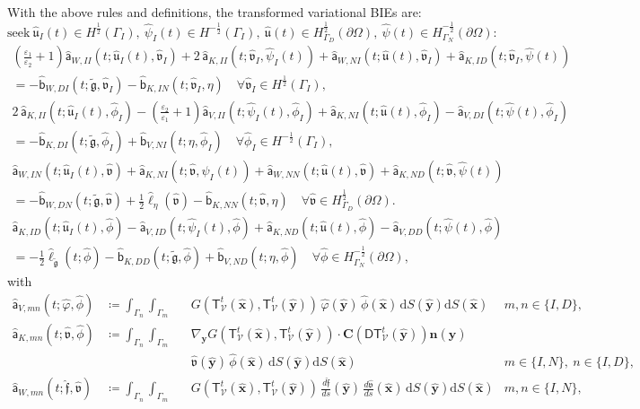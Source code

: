 \documentclass{article}
\theoremstyle{remark}
\newcommand{\T}{\mathsf{T}}
\newcommand{\aaa}{\mathsf{a}}
\newcommand{\bbb}{\mathsf{b}}
\newcommand{\hata}{\widehat{\aaa}}
\newcommand{\hatb}{\widehat{\bbb}}
\newcommand{\hatell}{\widehat{\ell}}
\newcommand{\dd}{\mathrm{d}}
\newcommand{\n}{\boldsymbol{n}}
\newcommand{\hatx}{\widehat{\boldsymbol{x}}}
\newcommand{\haty}{\widehat{\boldsymbol{y}}}
\newcommand{\argu}{\mathfrak{u}}
\newcommand{\argv}{\mathfrak{v}}
\newcommand{\argf}{\mathfrak{f}}
\newcommand{\argg}{\mathfrak{g}}
\newcommand{\tildeg}{\widetilde{\argg}}
\newcommand{\hatu}{\widehat{\argu}}
\newcommand{\hatv}{\widehat{\argv}}
\newcommand{\hatf}{\widehat{\argf}}
\newcommand{\hatpsi}{\widehat{\psi}}
\newcommand{\hatphi}{\widehat{\phi}}
\newcommand{\hatvphi}{\widehat{\varphi}}
\newcommand{\mat}[1]{\mathbf{#1}}
\newcommand{\Nu}{\mathcal{V}}
\newcommand{\Tt}{\T_\Nu^t}
\newcommand{\DTt}{\mathsf{DT}_\Nu^t}
\newcommand{\CDTt}[1]{\mat{C}(\DTt({#1}))}
\begin{document}
With the above rules and definitions, the transformed variational BIEs are:
\begin{equation*}
    \text{seek}~\hatu_I(t)\in H^{\frac{1}{2}}(\Gamma_I),
    ~\hatpsi_I(t)\in H^{-\frac{1}{2}}(\Gamma_I),
    ~\hatu(t)\in H^{\frac{1}{2}}_{\Gamma_D}(\partial\Omega),
    ~\hatpsi(t)\in H^{-\frac{1}{2}}_{\Gamma_N}(\partial\Omega):
\end{equation*}
\begin{multline*}
    \left(\frac{\varepsilon_1}{\varepsilon_2}+1\right)\hata_{W,II}(t;\hatu_I(t),\hatv_I)+2\,\hata_{K,II}(t;\hatv_I,\hatpsi_I(t))+\hata_{W,NI}(t;\hatu(t),\hatv_I)+\hata_{K,ID}(t;\hatv_I,\hatpsi(t))\\
    =-\hatb_{W,DI}(t;\tildeg,\hatv_I)-\hatb_{K,IN}(t;\hatv_I,\eta)\quad
    \forall\hatv_I\in H^{\frac{1}{2}}(\Gamma_I),
\end{multline*}
\begin{multline*}
    2\,\hata_{K,II}(t;\hatu_I(t),\hatphi_I)-\left(\frac{\varepsilon_2}{\varepsilon_1}+1\right)\hata_{V,II}(t;\hatpsi_I(t),\hatphi_I)+\hata_{K,NI}(t;\hatu(t),\hatphi_I)-\hata_{V,DI}(t;\hatpsi(t),\hatphi_I)\\
    =-\hatb_{K,DI}(t;\tildeg,\hatphi_I)+\hatb_{V,NI}(t;\eta,\hatphi_I)\quad
    \forall\hatphi_I\in H^{-\frac{1}{2}}(\Gamma_I),
\end{multline*}
\begin{multline*}
    \hata_{W,IN}(t;\hatu_I(t),\hatv)+\hata_{K,NI}(t;\hatv,\hatpsi_I(t))+\hata_{W,NN}(t;\hatu(t),\hatv)+\hata_{K,ND}(t;\hatv,\hatpsi(t))\\
    =-\hatb_{W,DN}(t;\tildeg,\hatv)+\frac{1}{2}\hatell_\eta(\hatv)-\hatb_{K,NN}(t;\hatv,\eta)\quad
    \forall\hatv\in H^{\frac{1}{2}}_{\Gamma_D}(\partial\Omega).
\end{multline*}
\begin{multline}
\label{eq:vf-pullback}
    \hata_{K,ID}(t;\hatu_I(t),\hatphi)-\hata_{V,ID}(t;\hatpsi_I(t),\hatphi)+\hata_{K,ND}(t;\hatu(t),\hatphi)-\hata_{V,DD}(t;\hatpsi(t),\hatphi)\\
    =-\frac{1}{2}\hatell_{\tildeg}(t;\hatphi)-\hatb_{K,DD}(t;\tildeg,\hatphi)+\hatb_{V,ND}(t;\eta,\hatphi)\quad
    \forall\hatphi\in H^{-\frac{1}{2}}_{\Gamma_N}(\partial\Omega),
\end{multline}
with
\begin{equation*}
\begin{aligned}
    \hata_{V,mn}(t;\hatvphi,\hatphi)&\coloneqq\int_{\Gamma_n}\int_{\Gamma_m}&&G(\Tt(\hatx),\Tt(\haty))\,\hatvphi(\haty)\,\hatphi(\hatx)\,\dd S(\haty)\dd S(\hatx)
    &m, n\in\{I,D\},\\
    \hata_{K,mn}(t;\hatv,\hatphi)&\coloneqq\int_{\Gamma_n}\int_{\Gamma_m}&&\nabla_{\boldsymbol y}G(\Tt(\hatx),\Tt(\haty))\cdot\CDTt{\haty}\n(\haty)&\\
    &&&\hatv(\haty)\,\hatphi(\hatx)\,\dd S(\haty)\dd S(\hatx)
    &m\in\{I,N\},~n\in\{I,D\},\\
    \hata_{W,mn}(t;\hatf,\hatv)&\coloneqq\int_{\Gamma_n}\int_{\Gamma_m}&&G(\Tt(\hatx),\Tt(\haty))\,\frac{d\hatf}{ds}(\haty)\,\frac{d\hatv}{ds}(\hatx)\,\dd S(\haty)\dd S(\hatx)
    &m, n\in\{I,N\},
\end{aligned}
\end{equation*}
\end{document}
